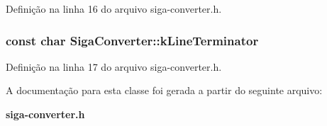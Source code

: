 Definição na linha 16 do arquivo siga-\/converter.\+h.

\subsubsection[{k\+Line\+Terminator}]{\setlength{\rightskip}{0pt plus 5cm}const char Siga\+Converter\+::k\+Line\+Terminator\hspace{0.3cm}{\ttfamily [static]}}\label{class_siga_converter_ada9458181a2c98350fae5f6313f9c4c8}


Definição na linha 17 do arquivo siga-\/converter.\+h.



A documentação para esta classe foi gerada a partir do seguinte arquivo\+:\begin{DoxyCompactItemize}
\item 
{\bf siga-\/converter.\+h}\end{DoxyCompactItemize}
